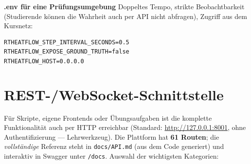 \documentclass[11pt,a4paper,parskip=half]{scrreprt}
\newcommand{\api}[1]{\texttt{#1}}
\newenvironment{beispiel}[1][Beispiel]
  {\par\medskip{\color{bsp}\hrule height 0.8pt}\nopagebreak\smallskip
   \noindent\textbf{\textsf{\textcolor{bsp}{#1}}}\quad\ignorespaces}
  {\par\nopagebreak\smallskip{\color{bsp}\hrule height 0.8pt}\par\medskip}
\begin{document}
\begin{beispiel}[.env für eine Prüfungsumgebung]
Doppeltes Tempo, strikte Beobachtbarkeit (Studierende können die Wahrheit auch
per API nicht abfragen), Zugriff aus dem Kursnetz:
\begin{lstlisting}
RTHEATFLOW_STEP_INTERVAL_SECONDS=0.5
RTHEATFLOW_EXPOSE_GROUND_TRUTH=false
RTHEATFLOW_HOST=0.0.0.0
\end{lstlisting}
\end{beispiel}

\appendix

\chapter{REST-/WebSocket-Schnittstelle}
\label{app:api}

Für Skripte, eigene Frontends oder Übungsaufgaben ist die komplette
Funktionalität auch per HTTP erreichbar (Standard:
\url{http://127.0.0.1:8001}, ohne Authentifizierung --- Lehrwerkzeug). Die
Plattform hat \textbf{61 Routen}; die \emph{vollständige} Referenz steht in
\api{docs/API.md} (aus dem Code generiert) und interaktiv in Swagger unter
\api{/docs}. Auswahl der wichtigsten Kategorien:
\end{document}

